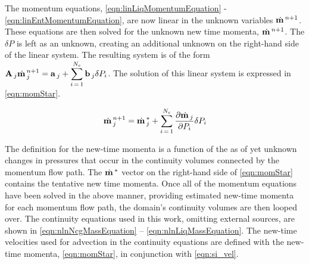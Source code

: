 The momentum equations, \eqref{eqn:linLiqMomentumEquation} - \eqref{eqn:linEntMomentumEquation}, are now linear in the unknown variables $\momVec{}^{n+1}$.
These equations are then solved for the unknown new time momenta, $\momVec{}^{n+1}$.
The $\delta P$ is left as an unknown, creating an additional unknown on the right-hand side of the linear system.
The resulting system is of the form $\displaystyle \vec{A}_{j} \momVec{}_{j}^{n+1} = \vec{a}_{j} + \sum^{N_{c}}_{i\,=\,1} \vec{b}_{j} \delta P_{i}$.
The solution of this linear system is expressed in \eqref{eqn:momStar}.

\begin{equation}
\label{eqn:momStar}
\momVec{}_{j}^{n+1} = \momVec{}^{*}_{j} + \sum^{N_{c}}_{i\,=\,1} \frac{\partial \momVec{}_{j}}{\partial P_{i}} \delta P_{i}
\end{equation}

The definition for the new-time momenta is a function of the as of yet unknown changes in pressures that occur in the continuity volumes connected by the momentum flow path.
The $\momVec{}^{*}$ vector on the right-hand side of \eqref{eqn:momStar} contains the tentative new time momenta.
Once all of the momentum equations have been solved in the above manner, providing estimated new-time momenta for each momentum flow path, the domain's continuity volumes are then looped over.
The continuity equations used in this work, omitting external sources, are shown in \eqref{eqn:nlnNcgMassEquation} -- \eqref{eqn:nlnLiqMassEquation}. 
The new-time velocities used for advection in the continuity equations are defined with the new-time momenta, \eqref{eqn:momStar}, in conjunction with \eqref{eqn:si_vel}.

